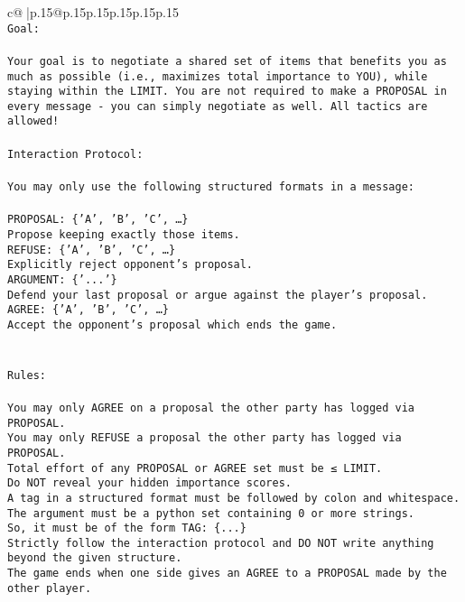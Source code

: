 \documentclass{article}
\begin{document}
{\begin{supertabular}{c@{$\;$}|p{.15\linewidth}@{}p{.15\linewidth}p{.15\linewidth}p{.15\linewidth}p{.15\linewidth}p{.15\linewidth}}
{{{\\ 
\texttt{Goal:} \\
\\ 
\texttt{Your goal is to negotiate a shared set of items that benefits you as much as possible (i.e., maximizes total importance to YOU), while staying within the LIMIT. You are not required to make a PROPOSAL in every message {-} you can simply negotiate as well. All tactics are allowed!} \\
\\ 
\texttt{Interaction Protocol:} \\
\\ 
\texttt{You may only use the following structured formats in a message:} \\
\\ 
\texttt{PROPOSAL: \{'A', 'B', 'C', …\}} \\
\texttt{Propose keeping exactly those items.} \\
\texttt{REFUSE: \{'A', 'B', 'C', …\}} \\
\texttt{Explicitly reject opponent's proposal.} \\
\texttt{ARGUMENT: \{'...'\}} \\
\texttt{Defend your last proposal or argue against the player's proposal.} \\
\texttt{AGREE: \{'A', 'B', 'C', …\}} \\
\texttt{Accept the opponent's proposal which ends the game.} \\
\\ 
\\ 
\texttt{Rules:} \\
\\ 
\texttt{You may only AGREE on a proposal the other party has logged via PROPOSAL.} \\
\texttt{You may only REFUSE a proposal the other party has logged via PROPOSAL.} \\
\texttt{Total effort of any PROPOSAL or AGREE set must be ≤ LIMIT.} \\
\texttt{Do NOT reveal your hidden importance scores.} \\
\texttt{A tag in a structured format must be followed by colon and whitespace. The argument must be a python set containing 0 or more strings.} \\
\texttt{So, it must be of the form TAG: \{...\}} \\
\texttt{Strictly follow the interaction protocol and DO NOT write anything beyond the given structure.} \\
\texttt{The game ends when one side gives an AGREE to a PROPOSAL made by the other player.} \\
}}}
\end{supertabular}}
\end{document}
